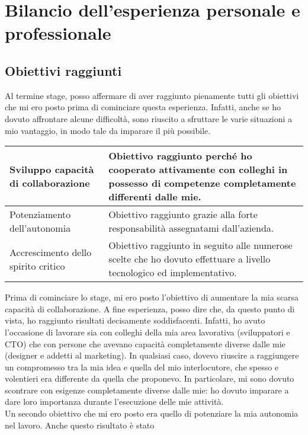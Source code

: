 	\section{Bilancio dell'esperienza personale e professionale}
		\subsection{Obiettivi raggiunti}
			Al termine stage, posso affermare di aver raggiunto pienamente tutti gli obiettivi che mi ero posto prima di cominciare
			questa esperienza. Infatti, anche se ho dovuto affrontare alcune difficoltà, sono riuscito a sfruttare le varie situazioni
			a mio vantaggio, in modo tale da imparare il più possibile.\\
			\begin{center}
				\begin{tabular}[H]{p{} | p{}}
					Sviluppo capacità di collaborazione &
					Obiettivo raggiunto perché ho cooperato attivamente con colleghi in possesso di competenze completamente
					differenti dalle mie.\\
					\hline
					Potenziamento dell'autonomia &
					Obiettivo raggiunto grazie alla forte responsabilità assegnatami dall'azienda.\\
					\hline
					Accrescimento dello spirito critico &
					Obiettivo raggiunto in seguito alle numerose scelte che ho dovuto effettuare a livello tecnologico ed
					implementativo.\\
				\end{tabular}
			\end{center}
			Prima di cominciare lo stage, mi ero posto l'obiettivo di aumentare la mia scarsa capacità di collaborazione. A fine
			esperienza, posso dire che, da questo punto di vista, ho raggiunto risultati decisamente soddisfacenti. Infatti, ho
			avuto l'occasione di lavorare sia con colleghi della mia area lavorativa (sviluppatori e CTO) che con persone che avevano
			capacità completamente diverse dalle mie (designer e addetti al marketing). In qualsiasi caso, dovevo riuscire a raggiungere
			un compromesso tra la mia idea e quella del mio interlocutore, che spesso e volentieri era differente da quella che
			proponevo. In particolare, mi sono dovuto scontrare con esigenze completamente diverse dalle mie: ho dovuto imparare a dare
			loro importanza durante l'esecuzione delle mie attività.\\
			Un secondo obiettivo che mi ero posto era quello di potenziare la mia autonomia nel lavoro. Anche questo risultato è stato
